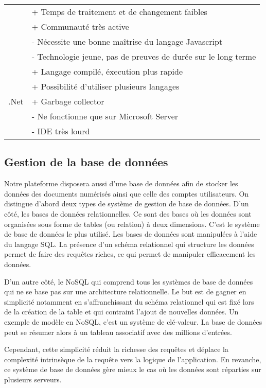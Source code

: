 \begin{tabular}{|l|l|}
                & + Temps de traitement et de changement faibles \\
                & + Communauté très active \\
                & - Nécessite une bonne maîtrise du langage Javascript \\
                & - Technologie jeune, pas de preuves de durée sur le long terme \\ \hline
            \multirow{6}{*}{.Net} & + Langage compilé, éxecution plus rapide \\
                & + Possibilité d'utiliser plusieurs langages \\
                & + Garbage collector \\
                & - Ne fonctionne que sur Microsoft Server \\
                & - IDE très lourd \\ 
            \hline
        \end{tabular}

    \subsection{Gestion de la base de données}
    \label{subsec:bdd}

    Notre plateforme disposera aussi d’une base de données afin de stocker les données des documents numérisés
    ainsi que celle des comptes utilisateurs. On distingue d’abord deux types de système de gestion de base de données.
    D’un côté, les bases de données relationnelles. Ce sont des bases où les données sont organisées sous forme de tables
    (ou relation) à deux dimensions. C’est le système de base de données le plus utilisé. Les bases de données sont manipulées
    à l’aide du langage SQL. La présence d’un schéma relationnel qui structure les données permet de faire
    des requêtes riches, ce qui permet de manipuler efficacement les données.

    D’un autre côté, le NoSQL qui comprend tous les systèmes de base de données qui ne se base pas sur une
    architecture relationnelle. Le but est de gagner en simplicité notamment en s’affranchissant du schéma relationnel
    qui est fixé lors de la création de la table et qui contraint l’ajout de nouvelles données. Un exemple de modèle en NoSQL,
    c’est un système de clé-valeur. La base de données peut se résumer alors à un tableau associatif avec des millions d’entrées.

    Cependant, cette simplicité réduit la richesse des requêtes et déplace la complexité intrinsèque de la requête vers
    la logique de l’application. En revanche, ce système de base de données gère mieux le cas où les données sont réparties sur plusieurs serveurs.

